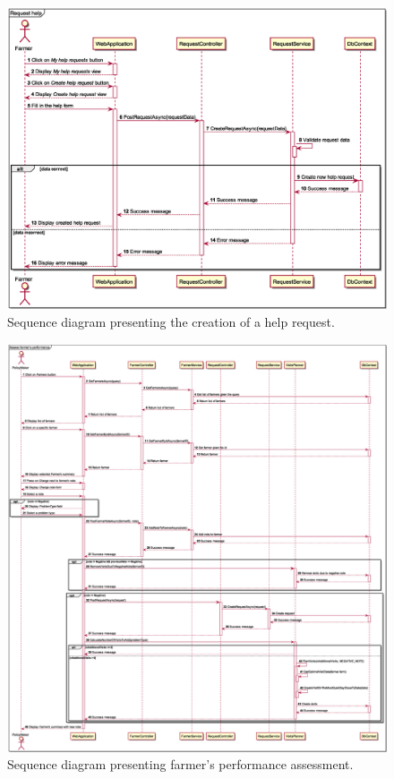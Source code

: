 \begin{figure}[H]
    \centering
    \includegraphics[height=\textheight, width=\textwidth, keepaspectratio, origin=c]{diagrams/sequence/request_help}
    \caption{Sequence diagram presenting the creation of a help request.}
    \label{fig:sd_request_help}
\end{figure}

\begin{figure}[H]
    \centering
    \includegraphics[height=\textheight, width=\textwidth, keepaspectratio, origin=c]{diagrams/sequence/assess_farmers_performance}
    \caption{Sequence diagram presenting farmer's performance assessment.}
    \label{fig:sd_assess_farmers_performance}
\end{figure}

